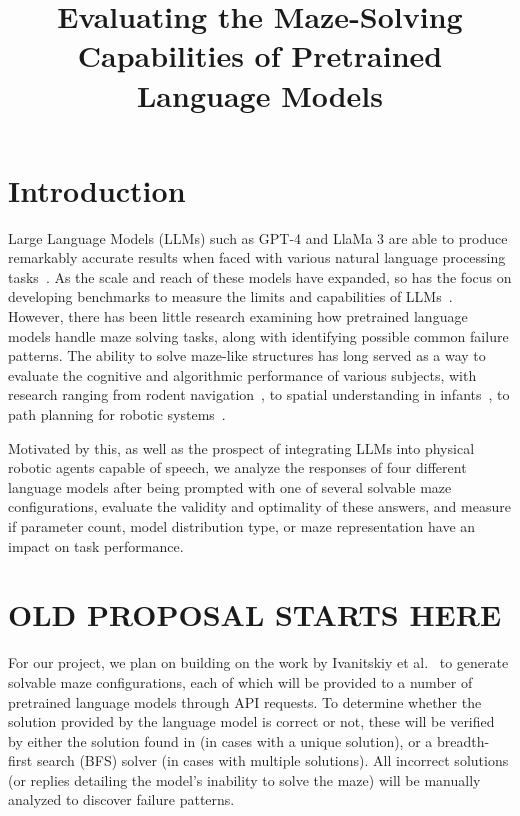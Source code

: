 \documentclass[conference]{IEEEtran}
\title{Evaluating the Maze-Solving Capabilities of Pretrained Language Models}
\author{\IEEEauthorblockN{Gabriel Del Castillo\IEEEauthorrefmark{1}, Nate Webster\IEEEauthorrefmark{2}}
\IEEEauthorblockA{\textit{Department of Computer Science} \\
\textit{Colorado School of Mines}\\
Golden, CO, USA \\
\IEEEauthorrefmark{1}gdelcastillo@mines.edu,
\IEEEauthorrefmark{2}nwebster@mines.edu
}
}
\begin{document}
\maketitle

\begin{abstract}
\end{abstract}

\section{Introduction}

Large Language Models (LLMs) such as GPT-4 and LlaMa 3 are able to produce remarkably accurate results when faced with various natural language processing tasks~\cite{}. As the scale and reach of these models have expanded, so has the focus on developing benchmarks to measure the limits and capabilities of LLMs~\cite{}. However, there has been little research examining how pretrained language models handle maze solving tasks, along with identifying possible common failure patterns. The ability to solve maze-like structures has long served as a way to evaluate the cognitive and algorithmic performance of various subjects, with research ranging from rodent navigation~\cite{tolman}, to spatial understanding in infants~\cite{piaget}, to path planning for robotic systems~\cite{stentz}.

Motivated by this, as well as the prospect of integrating LLMs into physical robotic agents capable of speech, we analyze the responses of four different language models after being prompted with one of several solvable maze configurations, evaluate the validity and optimality of these answers, and measure if parameter count, model distribution type, or maze representation have an impact on task performance.

\section{OLD PROPOSAL STARTS HERE}

For our project, we plan on building on the work by Ivanitskiy et al.~\cite{int1} to generate solvable maze configurations, each of which will be provided to a number of pretrained language models through API requests. To determine whether the solution provided by the language model is correct or not, these will be verified by either the solution found in \cite{int1} (in cases with a unique solution), or a breadth-first search (BFS) solver (in cases with multiple solutions). All incorrect solutions (or replies detailing the model's inability to solve the maze) will be manually analyzed to discover failure patterns.
\end{document}
